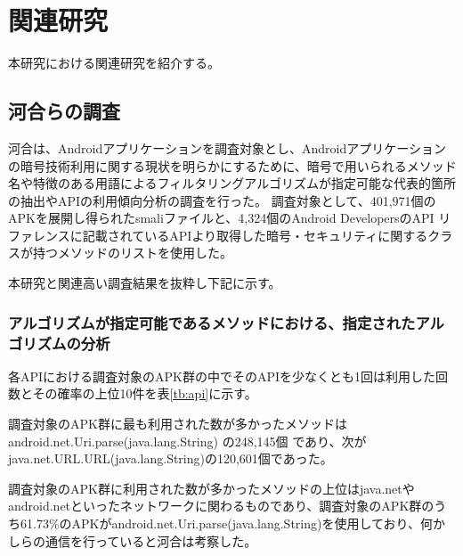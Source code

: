 \newpage
\section{関連研究} %
本研究における関連研究を紹介する。

\subsection{河合らの調査}
河合は、Androidアプリケーションを調査対象とし、Androidアプリケーションの暗号技術利用に関する現状を明らかにするために、暗号で用いられるメソッド名や特徴のある用語によるフィルタリングアルゴリズムが指定可能な代表的箇所の抽出やAPIの利用傾向分析の調査を行った。
調査対象として、401,971個のAPKを展開し得られたsmaliファイルと、4,324個のAndroid DevelopersのAPI リファレンスに記載されているAPIより取得した暗号・セキュリティに関するクラスが持つメソッドのリストを使用した。


本研究と関連高い調査結果を抜粋し下記に示す。

\subsubsection{アルゴリズムが指定可能であるメソッドにおける、指定されたアルゴリズムの分析}
各APIにおける調査対象のAPK群の中でそのAPIを少なくとも1回は利用した回数とその確率の上位10件を表\ref{tb:api}に示す。

調査対象のAPK群に最も利用された数が多かったメソッドは
android.net.Uri.parse(java.lang.String) の248,145個
であり、次がjava.net.URL.URL(java.lang.String)の120,601個であった。

調査対象のAPK群に利用された数が多かったメソッドの上位はjava.netやandroid.netといったネットワークに関わるものであり、調査対象のAPK群のうち61.73\%のAPKがandroid.net.Uri.parse(java.lang.String)を使用しており、何かしらの通信を行っていると河合は考察した。

